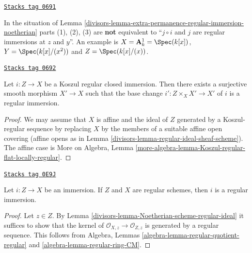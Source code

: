 \begin{remark}
\label{divisors-remark-not-always-extra-permanence}
\href{https://stacks.math.columbia.edu/tag/0691}{\texttt{Stacks tag 0691}}

In the situation of
Lemma \ref{divisors-lemma-extra-permanence-regular-immersion-noetherian}
parts (1), (2), (3) are {\bf not} equivalent to
``$j \circ i$ and $j$ are regular immersions at $z$ and $y$''.
An example is $X = \mathbf{A}^1_k = \Spec(k[x])$,
$Y = \Spec(k[x]/(x^2))$ and $Z = \Spec(k[x]/(x))$.
\end{remark}

\begin{lemma}
\label{divisors-lemma-koszul-regular-smooth-locally-regular}
\href{https://stacks.math.columbia.edu/tag/0692}{\texttt{Stacks tag 0692}}

Let $i : Z \to X$ be a Koszul regular closed immersion.
Then there exists a surjective smooth morphism $X' \to X$ such
that the base change $i' : Z \times_X X' \to X'$ of $i$ is
a regular immersion.
\end{lemma}

\begin{proof}

We may assume that $X$ is affine and the ideal of $Z$ generated by
a Koszul-regular sequence by replacing $X$ by the members of a suitable
affine open covering (affine opens as in
Lemma \ref{divisors-lemma-regular-ideal-sheaf-scheme}).
The affine case is
More on Algebra,
Lemma \ref{more-algebra-lemma-Koszul-regular-flat-locally-regular}.
\end{proof}

\begin{lemma}
\label{divisors-lemma-immersion-regular-regular-immersion}
\href{https://stacks.math.columbia.edu/tag/0E9J}{\texttt{Stacks tag 0E9J}}

Let $i : Z \to X$ be an immersion. If $Z$ and $X$ are
regular schemes, then $i$ is a regular immersion.
\end{lemma}

\begin{proof}

Let $z \in Z$. By Lemma \ref{divisors-lemma-Noetherian-scheme-regular-ideal}
it suffices to show that the kernel of
$\mathcal{O}_{X, z} \to \mathcal{O}_{Z, z}$
is generated by a regular sequence. This follows from
Algebra, Lemmas \ref{algebra-lemma-regular-quotient-regular} and
\ref{algebra-lemma-regular-ring-CM}.
\end{proof}

